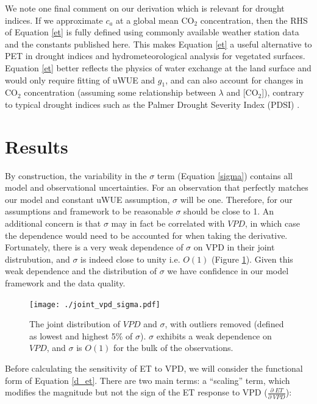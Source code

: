 \documentclass[draft,linenumbers]{agujournal}
\begin{document}
We note one final comment on our derivation which is relevant for drought indices. If we approximate $c_a$ at a global mean CO$_2$ concentration, then the RHS of Equation \ref{et} is fully defined using commonly available weather station data and the constants published here. This makes Equation \ref{et} a useful alternative to PET in drought indices and hydrometeorological analysis for vegetated surfaces. Equation \ref{et} better reflects the physics of water exchange at the land surface and would only require fitting of uWUE and $g_1$, and can also account for changes in CO$_2$ concentration (assuming some relationship between $\lambda$ and [CO$_2$]), contrary to typical drought indices such as the Palmer Drought Severity Index (PDSI) \citep{Swann_2016}.

\section{Results}
\label{results}

By construction, the variability in the $\sigma$ term (Equation \ref{sigma}) contains all model and observational uncertainties. For an observation that perfectly matches our model and constant uWUE assumption, $\sigma$ will be one. Therefore, for our assumptions and framework to be reasonable $\sigma$ should be close to 1. An additional concern is that $\sigma$ may in fact be correlated with $VPD$, in which case the dependence would need to be accounted for when taking the derivative. Fortunately, there is a very weak dependence of $\sigma$ on VPD in their joint distrubution, and $\sigma$ is indeed close to unity i.e. $O(1)$ (Figure \ref{joint_vpd_sigma}). Given this weak dependence and the distribution of $\sigma$ we have confidence in our model framework and the data quality.

\begin{figure}
\centering
\texttt{[image: ./joint\_vpd\_sigma.pdf]}
\caption{The joint distribution of $VPD$ and $\sigma$, with outliers removed (defined as lowest and highest 5\% of $\sigma$). $\sigma$ exhibits a weak dependence on $VPD$, and $\sigma$ is $O(1)$ for the bulk of the observations.}
\label{joint_vpd_sigma}
\end{figure}

Before calculating the sensitivity of ET to VPD, we will consider the functional form of Equation \ref{d_et}. There are two main terms: a ``scaling'' term, which modifies the magnitude but not the sign of the ET response to VPD  ($\frac{\partial \; ET}{\partial \; VPD}$):
\end{document}
